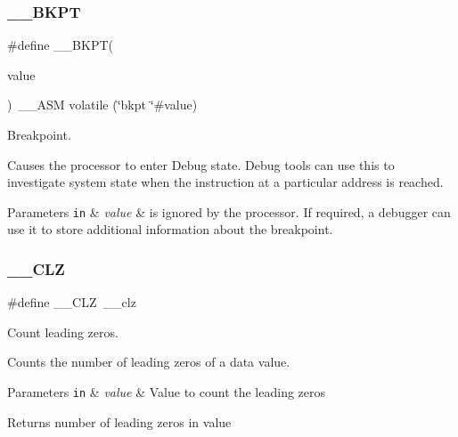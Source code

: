 \subsubsection{\texorpdfstring{\+\_\+\+\_\+\+B\+K\+PT}{\_\_BKPT}\hspace{0.1cm}{\footnotesize\ttfamily [3/3]}}
{\footnotesize\ttfamily \#define \+\_\+\+\_\+\+B\+K\+PT(\begin{DoxyParamCaption}\item[{}]{value }\end{DoxyParamCaption})~\+\_\+\+\_\+\+A\+SM volatile (\char`\"{}bkpt \char`\"{}\#value)}



Breakpoint. 

Causes the processor to enter Debug state. Debug tools can use this to investigate system state when the instruction at a particular address is reached. 
\begin{DoxyParams}[1]{Parameters}
\mbox{\tt in}  & {\em value} & is ignored by the processor. If required, a debugger can use it to store additional information about the breakpoint. \\
\hline
\end{DoxyParams}
\mbox{\label{group___c_m_s_i_s___core___instruction_interface_ga5d5bb1527e042be4a9fa5a33f65cc248}} 
\subsubsection{\texorpdfstring{\+\_\+\+\_\+\+C\+LZ}{\_\_CLZ}\hspace{0.1cm}{\footnotesize\ttfamily [1/3]}}
{\footnotesize\ttfamily \#define \+\_\+\+\_\+\+C\+LZ~\+\_\+\+\_\+clz}



Count leading zeros. 

Counts the number of leading zeros of a data value. 
\begin{DoxyParams}[1]{Parameters}
\mbox{\tt in}  & {\em value} & Value to count the leading zeros \\
\hline
\end{DoxyParams}
\begin{DoxyReturn}{Returns}
number of leading zeros in value 
\end{DoxyReturn}
\mbox{\label{group___c_m_s_i_s___core___instruction_interface_ga5d5bb1527e042be4a9fa5a33f65cc248}} 
